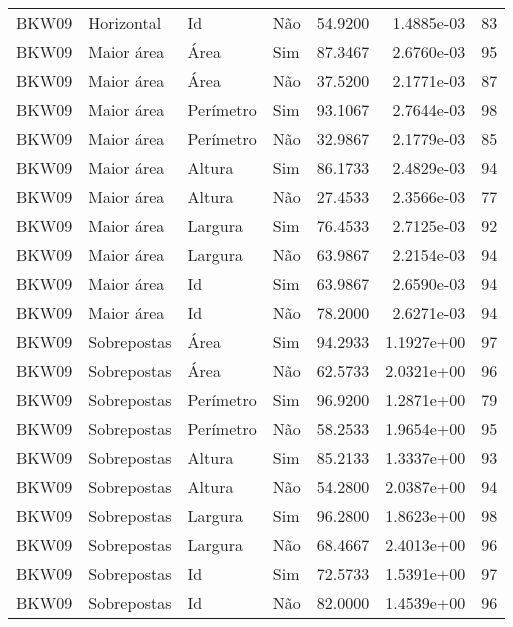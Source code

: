 \begin{tabular}{llllrrr}
BKW09     & Horizontal  & Id        & Não         & 54.9200      & 1.4885e-03 & 83       \\
BKW09     & Maior área  & Área      & Sim         & 87.3467      & 2.6760e-03 & 95       \\
BKW09     & Maior área  & Área      & Não         & 37.5200      & 2.1771e-03 & 87       \\
BKW09     & Maior área  & Perímetro & Sim         & 93.1067      & 2.7644e-03 & 98       \\
BKW09     & Maior área  & Perímetro & Não         & 32.9867      & 2.1779e-03 & 85       \\
BKW09     & Maior área  & Altura    & Sim         & 86.1733      & 2.4829e-03 & 94       \\
BKW09     & Maior área  & Altura    & Não         & 27.4533      & 2.3566e-03 & 77       \\
BKW09     & Maior área  & Largura   & Sim         & 76.4533      & 2.7125e-03 & 92       \\
BKW09     & Maior área  & Largura   & Não         & 63.9867      & 2.2154e-03 & 94       \\
BKW09     & Maior área  & Id        & Sim         & 63.9867      & 2.6590e-03 & 94       \\
BKW09     & Maior área  & Id        & Não         & 78.2000      & 2.6271e-03 & 94       \\
BKW09     & Sobrepostas & Área      & Sim         & 94.2933      & 1.1927e+00 & 97       \\
BKW09     & Sobrepostas & Área      & Não         & 62.5733      & 2.0321e+00 & 96       \\
BKW09     & Sobrepostas & Perímetro & Sim         & 96.9200      & 1.2871e+00 & 79       \\
BKW09     & Sobrepostas & Perímetro & Não         & 58.2533      & 1.9654e+00 & 95       \\
BKW09     & Sobrepostas & Altura    & Sim         & 85.2133      & 1.3337e+00 & 93       \\
BKW09     & Sobrepostas & Altura    & Não         & 54.2800      & 2.0387e+00 & 94       \\
BKW09     & Sobrepostas & Largura   & Sim         & 96.2800      & 1.8623e+00 & 98       \\
BKW09     & Sobrepostas & Largura   & Não         & 68.4667      & 2.4013e+00 & 96       \\
BKW09     & Sobrepostas & Id        & Sim         & 72.5733      & 1.5391e+00 & 97       \\
BKW09     & Sobrepostas & Id        & Não         & 82.0000      & 1.4539e+00 & 96       \\
\hline
\end{tabular}